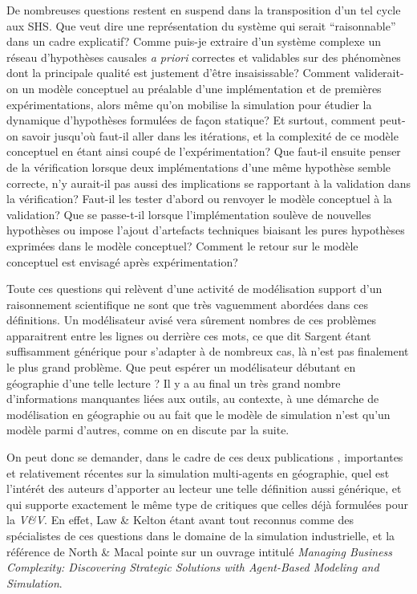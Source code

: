 De nombreuses questions restent en suspend dans la transposition d'un tel cycle aux SHS. Que veut dire une représentation du système qui serait \enquote{raisonnable} dans un cadre explicatif? Comme puis-je extraire d'un système complexe un réseau d'hypothèses causales \textit{a priori} correctes et validables sur des phénomènes dont la principale qualité est justement d'être insaisissable? Comment validerait-on un modèle conceptuel au préalable d'une implémentation et de premières expérimentations, alors même qu'on mobilise la simulation pour étudier la dynamique d'hypothèses formulées de façon statique? Et surtout, comment peut-on savoir jusqu'où faut-il aller dans les itérations, et la complexité de ce modèle conceptuel en étant ainsi coupé de l'expérimentation? Que faut-il ensuite penser de la vérification lorsque deux implémentations d'une même hypothèse semble correcte, n'y aurait-il pas aussi des implications se rapportant à la validation dans la vérification? Faut-il les tester d'abord ou renvoyer le modèle conceptuel à la validation? Que se passe-t-il lorsque l'implémentation soulève de nouvelles hypothèses ou impose l'ajout d'artefacts techniques biaisant les pures hypothèses exprimées dans le modèle conceptuel? Comment le retour sur le modèle conceptuel est envisagé après expérimentation?

Toute ces questions qui relèvent d'une activité de modélisation support d'un raisonnement scientifique ne sont que très vaguemment abordées dans ces définitions. Un modélisateur avisé vera sûrement nombres de ces problèmes apparaitrent entre les lignes ou derrière ces mots, ce que dit Sargent étant suffisamment générique pour s'adapter à de nombreux cas, là n'est pas finalement le plus grand problème. Que peut espérer un modélisateur débutant en géographie d'une telle lecture ? Il y a au final un très grand nombre d'informations manquantes liées aux outils, au contexte, à une démarche de modélisation en géographie ou au fait que le modèle de simulation n'est qu'un modèle parmi d'autres, comme on en discute par la suite.

On peut donc se demander, dans le cadre de ces deux publications \autocite{Crooks2008,Crooks2012}, importantes et relativement récentes sur la simulation multi-agents en géographie, quel est l'intérét des auteurs d'apporter au lecteur une telle définition aussi générique, et qui supporte exactement le même type de critiques que celles déjà formulées pour la \textit{V\&V}. En effet, Law \& Kelton étant avant tout reconnus comme des spécialistes de ces questions dans le domaine de la simulation industrielle, et la référence de North \& Macal pointe sur un ouvrage intitulé \textit{Managing Business Complexity: Discovering Strategic Solutions with Agent-Based Modeling and Simulation}.

